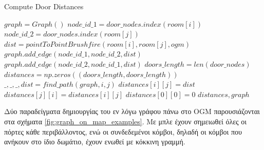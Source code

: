 \begin{algorithm}[H]
\caption{Compute Door Distances}
\label{alg:compute_door_distances}
\begin{algorithmic}[1]
    \State $graph = Graph()$
                    \State $node\_id\_1 = door\_nodes.index(room[i])$
                    \State $node\_id\_2 = door\_nodes.index(room[j])$
                    \State $dist = pointToPointBrushfire(room[i], room[j], ogm)$
                        \State \Return
                    \EndIf
                    \State $graph.add\_edge(node\_id\_1, node\_id\_2, dist)$
                    \State $graph.add\_edge(node\_id\_2, node\_id\_1, dist)$
                \EndFor
            \EndFor
        \EndIf
    \EndFor
    \State {}
    \State $doors\_length = len(door\_nodes)$
        \State $distances = np.zeros((doors\_length, doors\_length))$
                \State $\_, \_, \_, dist = find\_path(graph, i, j)$
                \State $distances[i][j] = dist$
                \State $distances[j][i] = distances[i][j]$
            \EndFor
        \EndFor
     \Else
        \State $distances[0][0] = 0$
    \EndIf
    \State \Return $distances, graph$
\end{algorithmic}
\end{algorithm}


Δύο παραδείγματα δημιουργίας του εν λόγω γράφου πάνω στο OGM παρουσιάζονται στα σχήματα \ref{fig:graph_on_map_examples}. Με μπλε έχουν σημειωθεί όλες οι πόρτες κάθε περιβάλλοντος, ενώ οι συνδεδεμένοι κόμβοι, δηλαδή οι κόμβοι που ανήκουν στο ίδιο δωμάτιο, έχουν ενωθεί με κόκκινη γραμμή.

